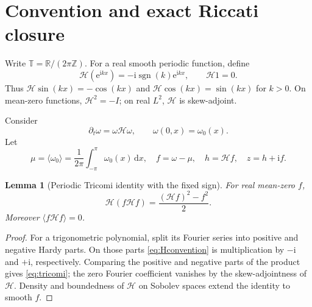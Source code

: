 \documentclass[10pt]{article}
\newcommand{\RR}{\mathbb R}
\newcommand{\ZZ}{\mathbb Z}
\newcommand{\TT}{\mathbb T}
\newcommand{\e}{\mathrm e}
\newcommand{\ii}{\mathrm i}
\newcommand{\dd}{\,\mathrm d}
\newcommand{\HH}{\mathcal H}
\newcommand{\mean}[1]{\langle #1\rangle}
\newtheorem{lemma}{Lemma}
\begin{document}
\section{Convention and exact Riccati closure}

Write $\TT=\RR/(2\pi\ZZ)$.  For a real smooth periodic function, define
\begin{equation}
 \HH(\e^{\ii kx})=-\ii\operatorname{sgn}(k)\e^{\ii kx},
 \qquad \HH1=0.                                  \label{eq:Hconvention}
\end{equation}
Thus $\HH\sin(kx)=-\cos(kx)$ and
$\HH\cos(kx)=\sin(kx)$ for $k>0$.  On mean-zero functions,
$\HH^2=-I$; on real $L^2$, $\HH$ is skew-adjoint.

Consider
\begin{equation}
 \partial_t\omega=\omega\HH\omega,
 \qquad \omega(0,x)=\omega_0(x).                \label{eq:clm}
\end{equation}
Let
\[
 \mu=\mean{\omega_0}=\frac1{2\pi}\int_{-\pi}^{\pi}\omega_0(x)\dd x,
 \quad f=\omega-\mu,\quad h=\HH f,\quad z=h+\ii f.
\]

\begin{lemma}[Periodic Tricomi identity with the fixed sign]\label{lem:tricomi}
For real mean-zero $f$,
\begin{equation}
 \HH(f\HH f)=\frac{(\HH f)^2-f^2}{2}.            \label{eq:tricomi}
\end{equation}
Moreover $\mean{f\HH f}=0$.
\end{lemma}

\begin{proof}
For a trigonometric polynomial, split its Fourier series into positive and
negative Hardy parts.  On those parts \eqref{eq:Hconvention} is multiplication
by $-\ii$ and $+\ii$, respectively.  Comparing the positive and negative
parts of the product gives \eqref{eq:tricomi}; the zero Fourier coefficient
vanishes by the skew-adjointness of $\HH$.  Density and boundedness of
$\HH$ on Sobolev spaces extend the identity to smooth $f$.
\end{proof}
\end{document}
